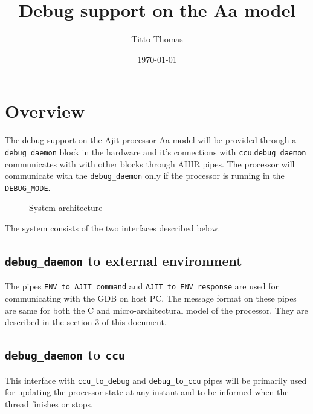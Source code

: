 \documentclass[a4paper, 11pt]{article}
\title{Debug support on the Aa model}
\author{Titto Thomas}
\date{\today}
\begin{document}
\maketitle


\renewcommand{\thesubsection}{\arabic{subsection}.}

\section{Overview}
\label{sec:overview}

The debug support on the Ajit processor Aa model will be provided through a \texttt{debug\_daemon} block in the hardware and it's connections with \texttt{ccu}.\texttt{debug\_daemon} communicates with with other blocks through AHIR pipes. The processor will communicate with the \texttt{debug\_daemon} only if the processor is running in the \texttt{DEBUG\_MODE}.

\begin{figure}[h!]
	\caption{System architecture}
\end{figure}

The system consists of the two interfaces described below.

\subsection{\texttt{debug\_daemon} to external environment}
The pipes \texttt{ENV\_to\_AJIT\_command} and \texttt{AJIT\_to\_ENV\_response} are used for communicating with the GDB on host PC. The message format on these pipes are same for both the C and micro-architectural model of the processor. They are described in the section 3 of this document.

\subsection{\texttt{debug\_daemon} to \texttt{ccu}}
This interface with \texttt{ccu\_to\_debug} and \texttt{debug\_to\_ccu} pipes will be primarily used for updating the processor state at any instant and to be informed when the thread finishes or stops.
\end{document}
